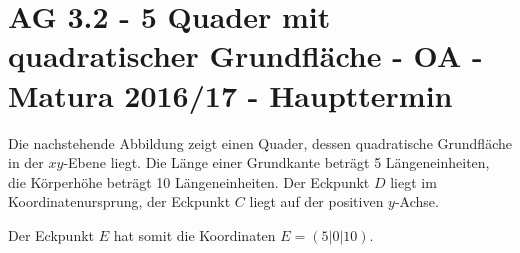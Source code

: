 \section{AG 3.2 - 5 Quader mit quadratischer Grundfläche - OA - Matura 2016/17 - Haupttermin}

\begin{beispiel}[AG 3.2]{1} %

Die nachstehende Abbildung zeigt einen Quader, dessen quadratische Grundfläche in der
$xy$-Ebene liegt. Die Länge einer Grundkante beträgt 5 Längeneinheiten, die Körperhöhe beträgt
10 Längeneinheiten. Der Eckpunkt $D$ liegt im Koordinatenursprung, der Eckpunkt $C$ liegt auf der positiven $y$-Achse. \leer

Der Eckpunkt $E$ hat somit die Koordinaten $E = (5|0|10)$.


\end{beispiel}
